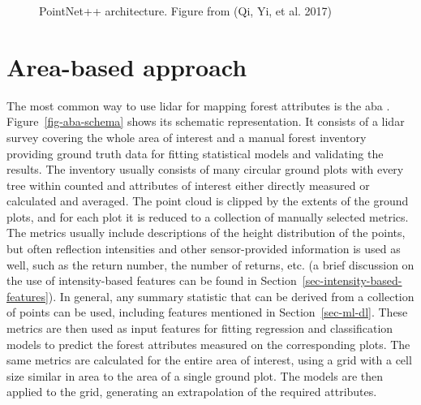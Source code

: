 \begin{figure}
\caption[PointNet++ architecture]{\label{fig-pointnet2-architecture}PointNet++ architecture.
Figure from (Qi, Yi, et al. 2017)}
\end{figure}

\section{Area-based approach}\label{sec-area-based-approach}

The most common way to use \gls{lidar} for mapping forest attributes is the \gls{aba} \citep{whiteABAGuide2013}.
Figure~\ref{fig-aba-schema} shows its schematic representation.
It consists of a \gls{lidar} survey covering the whole area of interest and a manual forest inventory providing ground truth data for fitting statistical models and validating the results.
The inventory usually consists of many circular ground plots with every tree within counted and attributes of interest either directly measured or calculated and averaged.
The point cloud is clipped by the extents of the ground plots, and for each plot it is reduced to a collection of manually selected metrics.
The metrics usually include descriptions of the height distribution of the points, but often reflection intensities and other sensor-provided information is used as well, such as the return number, the number of returns, etc. (a brief discussion on the use of intensity-based features can be found in Section~\ref{sec-intensity-based-features}).
In general, any summary statistic that can be derived from a collection of points can be used, including features mentioned in Section~\ref{sec-ml-dl}.
These metrics are then used as input features for fitting regression and classification models to predict the forest attributes measured on the corresponding plots.
The same metrics are calculated for the entire area of interest, using a grid with a cell size similar in area to the area of a single ground plot.
The models are then applied to the grid, generating an extrapolation of the required attributes.

